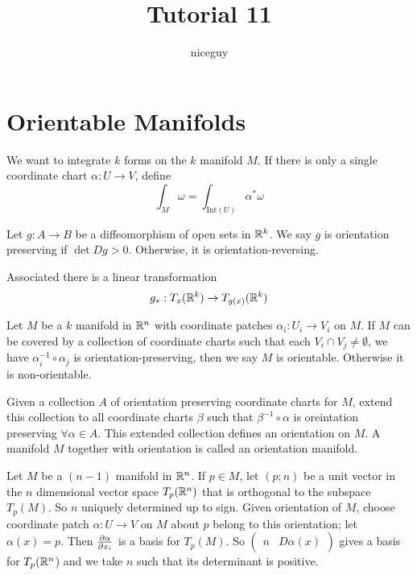 \documentclass[12pt]{article}
\title{Tutorial 11}
\author{niceguy}
\begin{document}
\maketitle

\section{Orientable Manifolds}

We want to integrate $k$ forms on the $k$ manifold $M$. If there is only a single coordinate chart $\alpha:U \rightarrow V$, define
$$\int_M\omega = \int_{\text{Int}(U)}\alpha^*\omega$$

\begin{defn}
    Let $g:A\rightarrow B$ be a diffeomorphism of open sets in $\mathbb{R}^k$. We say $g$ is orientation preserving if $\det Dg > 0$. Otherwise, it is orientation-reversing.
\end{defn}

Associated there is a linear transformation
$$g_*: T_x(\mathbb{R}^k) \rightarrow T_{g(x)}(\mathbb{R}^k)$$

\begin{defn}
    Let $M$ be a $k$ manifold in $\mathbb{R}^n$ with coordinate patches $\alpha_i: U_i \rightarrow V_i$ on $M$. If $M$ can be covered by a collection of coordinate charts such that each $V_i \cap V_j \ne \emptyset$, we have $\alpha_i^{-1}\circ\alpha_j$ is orientation-preserving, then we say $M$ is orientable. Otherwise it is non-orientable.
\end{defn}

\begin{defn}
    Given a collection $A$ of orientation preserving coordinate charts for $M$, extend this collection to all coordinate charts $\beta$ such that $\beta^{-1}\circ\alpha$ is oreintation preserving $\forall \alpha \in A$. This extended collection defines an orientation on $M$. A manifold $M$ together with orientation is called an orientation manifold.
\end{defn}

\begin{defn}
    Let $M$ be a $(n-1)$ manifold in $\mathbb{R}^n$. If $p \in M$, let $(p;n)$ be a unit vector in the $n$ dimensional vector space $T_p(\mathbb{R}^n)$ that is orthogonal to the subspace $T_p(M)$. So $n$ uniquely determined up to sign. Given orientation of $M$, choose coordinate patch $\alpha: U \rightarrow V$ on $M$ about $p$ belong to this orientation; let $\alpha(x) = p$. Then $\frac{\partial \alpha}{\partial x_i}$ is a basis for $T_p(M)$. So $\begin{pmatrix} n & D\alpha(x)\end{pmatrix}$ gives a basis for $T_p(\mathbb{R}^n$) and we take $n$ such that its determinant is positive.
\end{defn}
\end{document}
